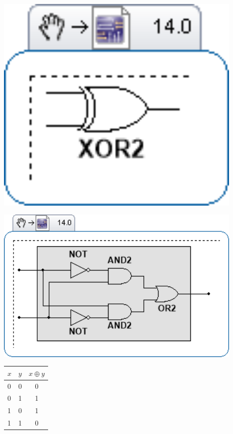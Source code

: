 \documentclass[11pt, a4paper, norwegian]{article}
\begin{document}
{\centering
\begin{minipage}{0.30\textwidth}
  \centering
  \includegraphics[width=0.9\textwidth]{port_xor.png}
  \label{fig_xor}
\end{minipage}
\begin{minipage}{0.30\textwidth}
  \centering
  \includegraphics[width=0.9\textwidth]{port_xorbuild.png}
  \label{fig_xorbuild}
\end{minipage}
\begin{minipage}{0.30\textwidth}
  \centering
  \label{tbl_xor}
  \begin{tabular}{|ll||c|}
        \hline
        $x$ & $y$ & $x \oplus y$ \\ \hline
        0 & 0 & 0 \\
        0 & 1 & 1 \\
        1 & 0 & 1 \\
        1 & 1 & 0 \\ \hline
  \end{tabular}
\end{minipage}
\endgraf\bigskip
}
\end{document}
